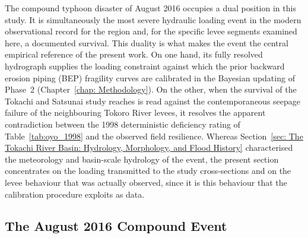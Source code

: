 The compound typhoon disaster of August 2016 occupies a dual position in this study. It is simultaneously the most severe hydraulic loading event in the modern observational record for the region and, for the specific levee segments examined here, a documented survival. This duality is what makes the event the central empirical reference of the present work. On one hand, its fully resolved hydrograph supplies the loading constraint against which the prior backward erosion piping (BEP) fragility curves are calibrated in the Bayesian updating of Phase~2 (Chapter~\ref{chap: Methodology}). On the other, when the survival of the Tokachi and Satsunai study reaches is read against the contemporaneous seepage failure of the neighbouring Tokoro River levees, it resolves the apparent contradiction between the 1998 deterministic deficiency rating of Table~\ref{tab:oyo_1998} and the observed field resilience. Whereas Section~\ref{sec: The Tokachi River Basin: Hydrology, Morphology, and Flood History} characterised the meteorology and basin-scale hydrology of the event, the present section concentrates on the loading transmitted to the study cross-sections and on the levee behaviour that was actually observed, since it is this behaviour that the calibration procedure exploits as data.

\subsection{The August 2016 Compound Event}
\label{subsec: The August 2016 Compound Event}

